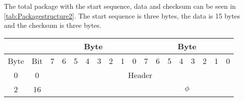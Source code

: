 %
The total package with the start sequence, data and checksum can be seen in \autoref{tab:Packagestructure2}. The start sequence is three bytes, the data is 15 bytes and the checksum is three bytes.
\begin{table}[H]
	\centering
	\begin{tabular}{llclllllllllllllll}
		\hline
		\multicolumn{2}{|c|}{}& \multicolumn{8}{c|}{Byte}                                                                                                                                                                           & \multicolumn{8}{c|}{Byte}                                                                                                                                                                                 \\ \hline
		\multicolumn{1}{|l|}{Byte} & \multicolumn{1}{l|}{Bit} & \multicolumn{1}{c|}{7} & \multicolumn{1}{c|}{6} & \multicolumn{1}{c|}{5} & \multicolumn{1}{c|}{4} & \multicolumn{1}{c|}{3} & \multicolumn{1}{c|}{2} & \multicolumn{1}{c|}{1} & \multicolumn{1}{c|}{0} & \multicolumn{1}{|c|}{7} & \multicolumn{1}{c|}{6} & \multicolumn{1}{c|}{5} & \multicolumn{1}{c|}{4} & \multicolumn{1}{c|}{3} & \multicolumn{1}{c|}{2} & \multicolumn{1}{c|}{1} & \multicolumn{1}{c|}{0} \\ \hline
		\multicolumn{1}{|c|}{0}    & \multicolumn{1}{c|}{0}   & \multicolumn{16}{c|}{Header}                                                                                                                                                                                                                                                                                                                                                                                        \\ \hline
		\multicolumn{1}{|c|}{2}    & \multicolumn{1}{c|}{16}  & \multicolumn{8}{c|}{}                                                                                                                                                                                 & \multicolumn{8}{c|}{$\phi$}                                                                                                                                                                                 \\ \hline

\end{tabular}
\end{table}
